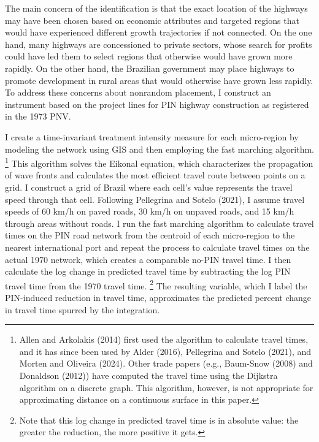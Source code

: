 \documentclass[11pt]{article}
\begin{document}
The main concern of the identification is that the exact location of the highways may have been chosen based on economic attributes and targeted regions that would have experienced different growth trajectories if not connected. On the one hand, many highways are concessioned to private sectors, whose search for profits could have led them to select regions that otherwise would have grown more rapidly. On the other hand, the Brazilian government may place highways to promote development in rural areas that would otherwise have grown less rapidly. To address these concerns about nonrandom placement, I construct an instrument based on the project lines for PIN highway construction as registered in the 1973 PNV.

I create a time-invariant treatment intensity measure for each micro-region by modeling the network using GIS and then employing the fast marching algorithm. \footnote{Allen and Arkolakis (2014) first used the algorithm to calculate travel times, and it has since been used by Alder (2016), Pellegrina and Sotelo (2021), and Morten and Oliveira (2024). Other trade papers (e.g., Baum-Snow (2008) and Donaldson (2012)) have computed the travel time using the Dijkstra algorithm on a discrete graph. This algorithm, however, is not appropriate for approximating distance on a continuous surface in this paper.} This algorithm solves the Eikonal equation, which characterizes the propagation of wave fronts and calculates the most efficient travel route between points on a grid. I construct a grid of Brazil where each cell's value represents the travel speed through that cell. Following Pellegrina and Sotelo (2021), I assume travel speeds of 60 km/h on paved roads, 30 km/h on unpaved roads, and 15 km/h through areas without roads. I run the fast marching algorithm to calculate travel times on the PIN road network from the centroid of each micro-region to the nearest international port and repeat the process to calculate travel times on the actual 1970 network, which creates a comparable no-PIN travel time. I then calculate the log change in predicted travel time by subtracting the log PIN travel time from the 1970 travel time. \footnote{Note that this log change in predicted travel time is in absolute value: the greater the reduction, the more positive it gets.} The resulting variable, which I label the PIN-induced reduction in travel time, approximates the predicted percent change in travel time spurred by the integration.
\end{document}
